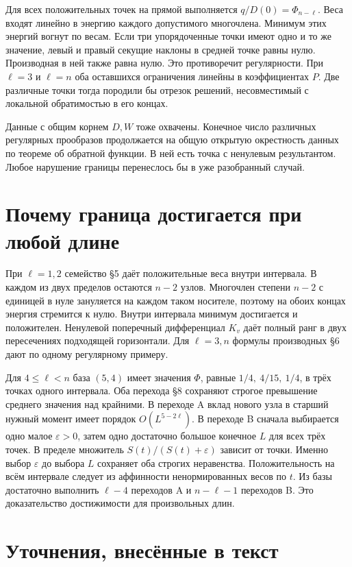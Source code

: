 \documentclass[12pt,a4paper]{article}
\begin{document}
Для всех положительных точек на прямой выполняется \(q/D(0)=\Phi_{n-\ell}\). Веса входят линейно в энергию каждого допустимого многочлена. Минимум этих энергий вогнут по весам. Если три упорядоченные точки имеют одно и то же значение, левый и правый секущие наклоны в средней точке равны нулю. Производная в ней также равна нулю. Это противоречит регулярности. При \(\ell=3\) и \(\ell=n\) оба оставшихся ограничения линейны в коэффициентах \(P\). Две различные точки тогда породили бы отрезок решений, несовместимый с локальной обратимостью в его концах.

Данные с общим корнем \(D,W\) тоже охвачены. Конечное число различных регулярных прообразов продолжается на общую открытую окрестность данных по теореме об обратной функции. В ней есть точка с ненулевым результантом. Любое нарушение границы перенеслось бы в уже разобранный случай.

\section*{\color{ink} Почему граница достигается при любой длине}

При \(\ell=1,2\) семейство §5 даёт положительные веса внутри интервала. В каждом из двух пределов остаются \(n-2\) узлов. Многочлен степени \(n-2\) с единицей в нуле зануляется на каждом таком носителе, поэтому на обоих концах энергия стремится к нулю. Внутри интервала минимум достигается и положителен. Ненулевой поперечный дифференциал \(K_v\) даёт полный ранг в двух пересечениях подходящей горизонтали. Для \(\ell=3,n\) формулы производных §6 дают по одному регулярному примеру.

Для \(4\le\ell<n\) база \((5,4)\) имеет значения \(\Phi\), равные \(1/4,\ 4/15,\ 1/4\), в трёх точках одного интервала. Оба перехода §8 сохраняют строгое превышение среднего значения над крайними. В переходе A вклад нового узла в старший нужный момент имеет порядок \(O(L^{5-2\ell})\). В переходе B сначала выбирается одно малое \(\varepsilon>0\), затем одно достаточно большое конечное \(L\) для всех трёх точек. В пределе множитель \(S(t)/(S(t)+\varepsilon)\) зависит от точки. Именно выбор \(\varepsilon\) до выбора \(L\) сохраняет оба строгих неравенства. Положительность на всём интервале следует из аффинности ненормированных весов по \(t\). Из базы достаточно выполнить \(\ell-4\) переходов A и \(n-\ell-1\) переходов B. Это доказательство достижимости для произвольных длин.

\section*{\color{ink} Уточнения, внесённые в текст}
\end{document}
